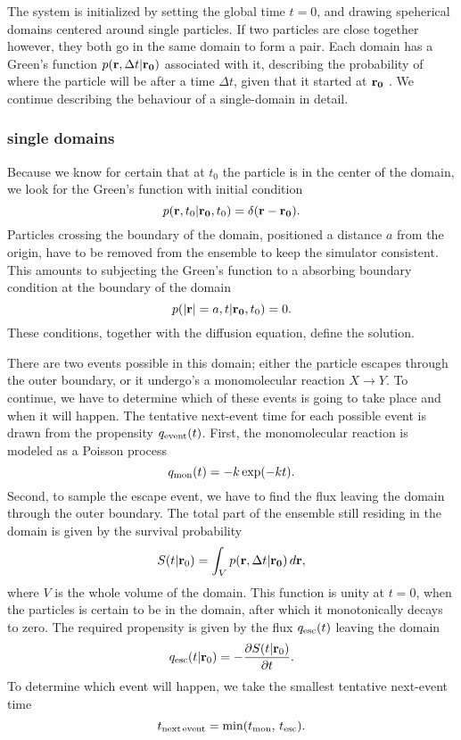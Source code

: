The system is initialized by setting the global time $t=0$, and drawing speherical domains centered around single particles. If two particles are close together however, they both go in the same domain to form a pair. Each domain has a Green's function $p({\bf r}, \Delta t|{\bf r_0})$ associated with it, describing the probability of where the particle will be after a time $\Delta t$, given that it started at ${\bf r_0}$ \cite{Carslaw1959}. We continue describing the behaviour of a single-domain in detail.

\subsubsection{single domains}
Because we know for certain that at $t_0$ the particle is in the center of the domain, we look for the Green's function with initial condition
\begin{equation}
 p({\bf r}, t_0|{\bf r_0},t_0) = \delta(\mathbf{r - r_0}).
\end{equation}
Particles crossing the boundary of the domain, positioned a distance $a$ from the origin, have to be removed from the ensemble to keep the simulator consistent. This amounts to subjecting the Green's function to a absorbing boundary condition at the boundary of the domain
\begin{equation}
 p({\bf |r|}=a, t|{\bf r_0},t_0) = 0.
\end{equation}
These conditions, together with the diffusion equation, define the solution. \cite{Carslaw1959}\cite{Beck1992} 

There are two events possible in this domain; either the particle escapes through the outer boundary, or it undergo's a monomolecular reaction $X\rightarrow Y$. To continue, we have to determine which of these events is going to take place and when it will happen. The tentative next-event time for each possible event is drawn from the propensity $q_{\rm event}(t)$. First, the monomolecular reaction is modeled as a Poisson process
\begin{equation}
 q_{\rm mon}(t) = -k\, {\rm exp}(-k t).
\end{equation}
Second, to sample the escape event, we have to find the flux leaving the domain through the outer boundary. The total part of the ensemble still residing in the domain is given by the survival probability
\begin{equation}
 S(t|{\mathbf r_0}) = \int_V p({\bf r}, \Delta t|{\bf r_0}) \, d{\mathbf r},
 \elabel{Surv}
\end{equation}
where $V$ is the whole volume of the domain. This function is unity at $t=0$, when the particles is certain to be in the domain, after which it monotonically decays to zero. The required propensity is given by the flux $q_{\rm esc}(t)$ leaving the domain
\begin{equation}
 q_{\rm esc}(t|{\mathbf r_0}) = -\pdiff{S(t|{\mathbf r_0})}{t}.
 \elabel{Sflux}
\end{equation}
To determine which event will happen, we take the smallest tentative next-event time
\begin{equation}
 t_{\rm next\,event} = {\rm min}(t_{\rm mon},\,t_{\rm esc}).
\end{equation}

